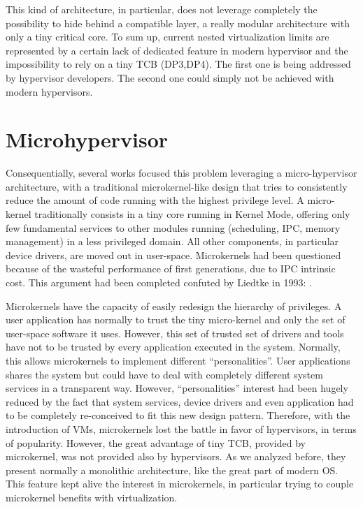 \documentclass{acm_proc_article-sp} %
\begin{document}
This kind of architecture, in particular, does not leverage completely the possibility to hide behind a compatible layer, a really modular architecture with only a tiny critical core.
To sum up, current nested virtualization limits are represented by a certain lack of dedicated feature in modern hypervisor and the impossibility to rely on a tiny TCB (DP3,DP4).
The first one is being addressed by hypervisor developers. The second one could simply not be achieved with modern hypervisors. 

\section{Microhypervisor}


Consequentially, several works focused this problem leveraging a micro-hypervisor architecture, with a traditional microkernel-like design that tries to consistently reduce the amount of code running with the highest privilege level. A micro-kernel traditionally consists in a tiny core running in Kernel Mode, offering only few fundamental services to other modules running (scheduling, IPC, memory management) in a less privileged domain. All other components, in particular device drivers, are moved out in user-space.
Microkernels had been questioned because of the wasteful performance of first generations, due to IPC intrinsic cost. This argument had been completed confuted by Liedtke in 1993: \cite{liedtke1993ImpIPCbyKerDes,liedtke1995micCon}.

Microkernels have the capacity of easily redesign the hierarchy of privileges. A user application has normally to trust the tiny micro-kernel and only the set of user-space software it uses. However, this set of trusted set of drivers and tools have not to be trusted by every application executed in the system. Normally, this allows microkernels to implement different ``personalities''. User applications shares the system but could have to deal with completely different system services in a transparent way. However, ``personalities'' interest had been hugely reduced by the fact that system services, device drivers and even application had to be completely re-conceived to fit this new design pattern. Therefore, with the introduction of VMs, microkernels lost the battle in favor of hypervisors, in terms of popularity. However, the great advantage of tiny TCB, provided by microkernel, was not provided also by hypervisors. As we analyzed before, they present normally a monolithic architecture, like the great part of modern OS. This feature kept alive the interest in microkernels, in particular trying to couple microkernel benefits with virtualization.
\end{document}
